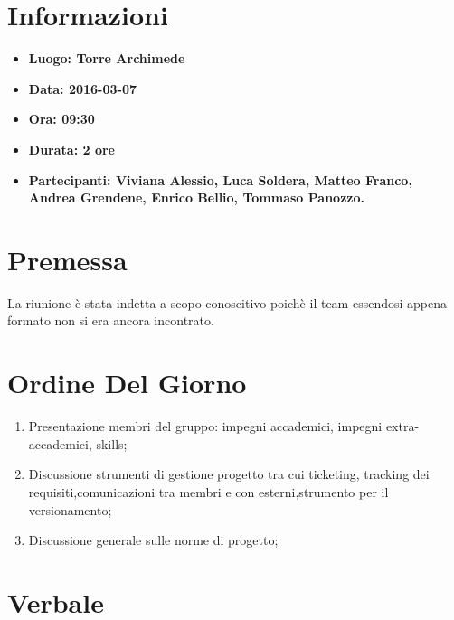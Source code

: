 \documentclass[a4paper,titlepage]{article}
\begin{document}
\maketitle

\newpage
\tableofcontents

\newpage
\section{Informazioni}
\label{sec:Informazioni}

\begin{itemize}
  \item \textbf{Luogo: Torre Archimede}
  \item \textbf{Data: 2016-03-07}
  \item \textbf{Ora: 09:30}
  \item \textbf{Durata: 2 ore}
  \item \textbf{Partecipanti: Viviana Alessio, Luca Soldera, Matteo Franco, Andrea Grendene, Enrico Bellio, Tommaso Panozzo.}
\end{itemize}

\newpage
\section{Premessa}

La riunione è stata indetta a scopo conoscitivo poichè il team essendosi appena formato non si era ancora incontrato.

\section{Ordine Del Giorno}
\label{sec:OrdineDelGiorno}

\begin{enumerate}
  \item Presentazione membri del gruppo: impegni accademici, impegni extra-accademici, skills;
  \item Discussione strumenti di gestione progetto tra cui ticketing, tracking dei requisiti,comunicazioni tra membri e con esterni,strumento per il versionamento;
  \item Discussione generale sulle norme di progetto;
\end{enumerate}

\newpage
\section{Verbale}
\label{sec:Verbale}
\end{document}

